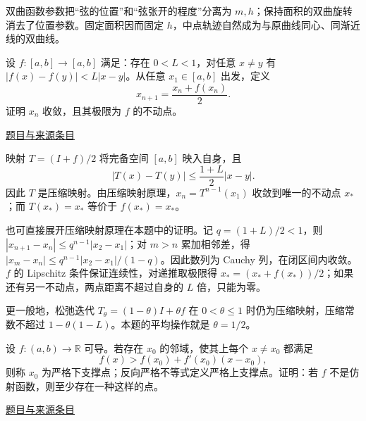 \documentclass[12pt,fontset=fandol]{ctexart}
\begin{document}
\begin{remark}[方法与条件]双曲函数参数把“弦的位置”和“弦张开的程度”分离为 $m,h$；保持面积的双曲旋转消去了位置参数。固定面积因而固定 $h$，中点轨迹自然成为与原曲线同心、同渐近线的双曲线。\end{remark}

\begin{example}[来源序号2]\label{ex:fin04-all:2}\label{pr:fin04-all:2}

设 $f:[a,b]\to[a,b]$ 满足：存在 $0<L<1$，对任意 $x\ne y$ 有
$|f(x)-f(y)|<L|x-y|$。从任意 $x_1\in[a,b]$ 出发，定义
\[
x_{n+1}=\frac{x_n+f(x_n)}2.
\]
证明 $x_n$ 收敛，且其极限为 $f$ 的不动点。

\par\href{https://github.com/lzxcr/cmc-mathematics/blob/64916fa1fdbc3e444a652eca204d5669058ee321/src/problems/finals/04/02.md}{题目与来源条目}

\end{example}

\begin{solve}\label{ans:fin04-all:2}

映射 $T=(I+f)/2$ 将完备空间 $[a,b]$ 映入自身，且
\[
|T(x)-T(y)|\le\frac{1+L}{2}|x-y|.
\]
因此 $T$ 是压缩映射。由压缩映射原理，$x_n=T^{n-1}(x_1)$ 收敛到唯一的不动点 $x_*$；而 $T(x_*)=x_*$ 等价于 $f(x_*)=x_*$。

也可直接展开压缩映射原理在本题中的证明。记 $q=(1+L)/2<1$，则 $|x_{n+1}-x_n|\le q^{n-1}|x_2-x_1|$；对 $m>n$ 累加相邻差，得 $|x_m-x_n|\le q^{n-1}|x_2-x_1|/(1-q)$。因此数列为 Cauchy 列，在闭区间内收敛。$f$ 的 Lipschitz 条件保证连续性，对递推取极限得 $x_*=(x_*+f(x_*))/2$；如果还有另一不动点，两点距离不超过自身的 $L$ 倍，只能为零。

\end{solve}

\begin{remark}[方法与条件]更一般地，松弛迭代 $T_\theta=(1-\theta)I+\theta f$ 在 $0<\theta\le1$ 时仍为压缩映射，压缩常数不超过 $1-\theta(1-L)$。本题的平均操作就是 $\theta=1/2$。\end{remark}

\begin{example}[来源序号4]\label{ex:fin04-all:4}\label{pr:fin04-all:4}

设 $f:(a,b)\to\mathbb R$ 可导。若存在 $x_0$ 的邻域，使其上每个 $x\ne x_0$ 都满足
\[
f(x)>f(x_0)+f'(x_0)(x-x_0),
\]
则称 $x_0$ 为严格下支撑点；反向严格不等式定义严格上支撑点。证明：若 $f$ 不是仿射函数，则至少存在一种这样的点。

\par\href{https://github.com/lzxcr/cmc-mathematics/blob/64916fa1fdbc3e444a652eca204d5669058ee321/src/problems/finals/04/04.md}{题目与来源条目}

\end{example}
\end{document}
